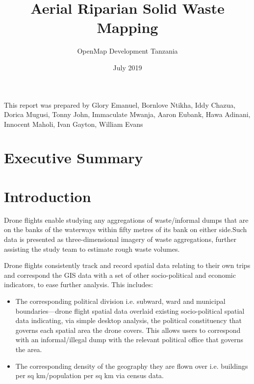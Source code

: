 \documentclass[a4paper,12pt,twoside]{article}
\title{Aerial Riparian Solid Waste Mapping}
\author{OpenMap Development Tanzania}
\date{July 2019}
\begin{document}
\maketitle

This report was prepared by Glory Emanuel, Bornlove Ntikha, Iddy Chazua, Dorica Mugusi, Tonny John, Immaculate Mwanja, Aaron Eubank, Hawa Adinani, Innocent Maholi, Ivan Gayton, William Evans


\newpage
\tableofcontents

\newpage
\section{Executive Summary}
\begin{multicols}{2}

\lipsum[0-3]

\end{multicols}

\section{Introduction}

\lipsum[0-4]
  
Drone flights enable studying any aggregations of waste/informal dumps that are on the banks of the waterways within fifty metres of its bank on either side.Such data is presented as three-dimensional imagery of waste aggregations, further assisting the study team to estimate rough waste volumes.

Drone flights consistently track and record spatial data relating to their own trips and correspond the GIS data with a set of other socio-political and economic indicators, to ease further analysis. This includes:   

\begin{itemize}
    \item The corresponding political division i.e. subward, ward and municipal boundaries—drone flight spatial data overlaid existing socio-political spatial data indicating, via simple desktop analysis, the political constituency that governs each spatial area the drone covers. This allows users to correspond with an informal/illegal dump with the relevant political office that governs the area.
    \item The corresponding density of the geography they are flown over i.e. buildings per sq km/population per sq km via census data. 
\end{itemize}
\end{document}
